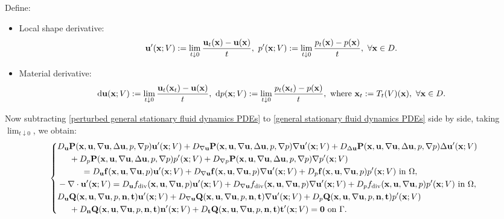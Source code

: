 \documentclass[oneside,11pt]{book}
\numberwithin{equation}{section}
\begin{document}
Define:
\begin{itemize}
    \item Local shape derivative:
    \begin{align*}
        {\bf u}'({\bf x};V) := \lim_{t\downarrow 0} \frac{{\bf u}_t({\bf x}) - {\bf u}({\bf x})}{t},\ p'({\bf x};V) := \lim_{t\downarrow 0} \frac{p_t({\bf x}) - p({\bf x})}{t},\ \forall{\bf x}\in D.
    \end{align*}
    \item Material derivative:
    \begin{align*}
        {\rm d}{\bf u}({\bf x};V) := \lim_{t\downarrow 0} \frac{{\bf u}_t({\bf x}_t) - {\bf u}({\bf x})}{t},\ {\rm d}p({\bf x};V) := \lim_{t\downarrow 0} \frac{p_t({\bf x}_t) - p({\bf x})}{t}, \mbox{ where } {\bf x}_t := T_t(V)({\bf x}),\ \forall{\bf x}\in D.
    \end{align*}
\end{itemize}
Now subtracting \eqref{perturbed general stationary fluid dynamics PDEs} to \eqref{general stationary fluid dynamics PDEs} side by side, taking $\lim_{t\downarrow 0}$, we obtain:
\begin{equation}
    \label{PDEs local shape derivative for general stationary fluid dynamics PDEs}
    \left\{\begin{split}
        &D_{\bf u}{\bf P}({\bf x},{\bf u},\nabla{\bf u},\Delta{\bf u},p,\nabla p){\bf u}'({\bf x};V) + D_{\nabla{\bf u}}{\bf P}({\bf x},{\bf u},\nabla{\bf u},\Delta{\bf u},p,\nabla p)\nabla{\bf u}'({\bf x};V) + D_{\Delta{\bf u}}{\bf P}({\bf x},{\bf u},\nabla{\bf u},\Delta{\bf u},p,\nabla p)\Delta{\bf u}'({\bf x};V)\\
        &\hspace{5mm}+ D_p{\bf P}({\bf x},{\bf u},\nabla{\bf u},\Delta{\bf u},p,\nabla p)p'({\bf x};V) + D_{\nabla p}{\bf P}({\bf x},{\bf u},\nabla{\bf u},\Delta{\bf u},p,\nabla p)\nabla p'({\bf x};V)\\
        &\hspace{1cm}= D_{\bf u}{\bf f}({\bf x},{\bf u},\nabla{\bf u},p){\bf u}'({\bf x};V) + D_{\nabla{\bf u}}{\bf f}({\bf x},{\bf u},\nabla{\bf u},p)\nabla{\bf u}'({\bf x};V) + D_p{\bf f}({\bf x},{\bf u},\nabla{\bf u},p)p'({\bf x};V) \mbox{ in } \Omega,\\
        &-\nabla\cdot{\bf u}'({\bf x};V) = D_{\bf u}f_{\rm div}({\bf x},{\bf u},\nabla{\bf u},p){\bf u}'({\bf x};V) + D_{\nabla{\bf u}}f_{\rm div}({\bf x},{\bf u},\nabla{\bf u},p)\nabla{\bf u}'({\bf x};V) + D_pf_{\rm div}({\bf x},{\bf u},\nabla{\bf u},p)p'({\bf x};V) \mbox{ in } \Omega,\\
        &D_{\bf u}{\bf Q}({\bf x},{\bf u},\nabla{\bf u},p,{\bf n},{\bf t}){\bf u}'({\bf x};V) + D_{\nabla{\bf u}}{\bf Q}({\bf x},{\bf u},\nabla{\bf u},p,{\bf n},{\bf t})\nabla{\bf u}'({\bf x};V) + D_p{\bf Q}({\bf x},{\bf u},\nabla{\bf u},p,{\bf n},{\bf t})p'({\bf x};V)\\
        &\hspace{5mm}+ D_{\bf n}{\bf Q}({\bf x},{\bf u},\nabla{\bf u},p,{\bf n},{\bf t}){\bf n}'({\bf x};V) + D_{\bf t}{\bf Q}({\bf x},{\bf u},\nabla{\bf u},p,{\bf n},{\bf t}){\bf t}'({\bf x};V) = {\bf 0} \mbox{ on } \Gamma.
    \end{split}\right.
\end{equation}
\end{document}
